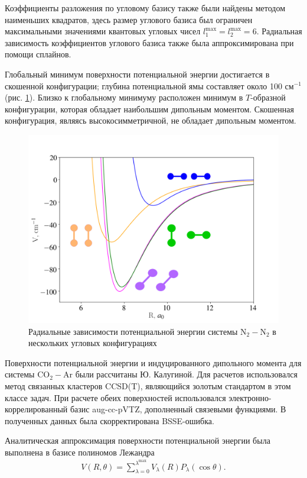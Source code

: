 Коэффициенты разложения по угловому базису также были найдены методом наименьших квадратов, здесь размер углового базиса был ограничен максимальными значениями квантовых угловых чисел $l_1^\text{max} = l_2^\text{max} = 6$. Радиальная зависимость коэффициентов углового базиса также была аппроксимирована при помощи сплайнов. \par
Глобальный минимум поверхности потенциальной энергии достигается в скошенной конфигурации; глубина потенциальной ямы составляет около 100 см$^{-1}$ (рис. \ref{fig:n2n2-potential-curves}). Близко к глобальному минимуму расположен минимум в $T$-образной конфигурации, которая обладает наибольшим дипольным моментом. Скошенная конфигурация, являясь высокосимметричной, не обладает дипольным моментом. 

\begin{figure}[H]
    \centering
    \includegraphics[width=0.75\linewidth]{./pictures/n2n2_potential.png}
    \caption{Радиальные зависимости потенциальной энергии системы N$_2-$N$_2$ в нескольких угловых конфигурациях}
    \label{fig:n2n2-potential-curves}
\end{figure}

Поверхности потенциальной энергии и индуцированного дипольного момента для системы CO$_2-$Ar были рассчитаны Ю. Калугиной. Для расчетов использовался метод связанных кластеров CCSD(T), являющийся золотым стандартом в этом классе задач. При расчете обеих поверхностей использовался электронно-коррелированный базис aug-cc-pVTZ, дополненный связевыми функциями. В полученных данных была скорректирована BSSE-ошибка. \par
Аналитическая аппроксимация поверхности потенциальной энергии была выполнена в базисе полиномов Лежандра
\begin{gather}
    V(R, \theta) = \sum_{\lambda = 0}^{\lambda^\text{max}} V_\lambda(R) P_\lambda(\cos \theta). \label{co2-ar-expansion}
\end{gather}

